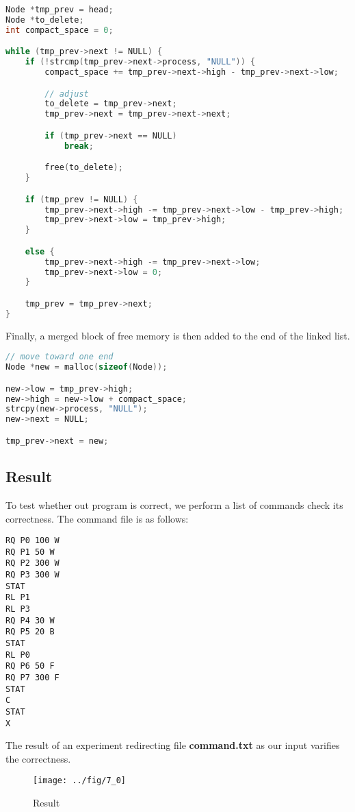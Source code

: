\documentclass{article}
\begin{document}
\begin{lstlisting}[language=c, caption={Traversing the Linked List}]
Node *tmp_prev = head;
Node *to_delete;
int compact_space = 0;

while (tmp_prev->next != NULL) {
    if (!strcmp(tmp_prev->next->process, "NULL")) {
        compact_space += tmp_prev->next->high - tmp_prev->next->low;

        // adjust
        to_delete = tmp_prev->next;
        tmp_prev->next = tmp_prev->next->next;

        if (tmp_prev->next == NULL)
            break;

        free(to_delete);
    }

    if (tmp_prev != NULL) {
        tmp_prev->next->high -= tmp_prev->next->low - tmp_prev->high;
        tmp_prev->next->low = tmp_prev->high;
    }

    else {
        tmp_prev->next->high -= tmp_prev->next->low;
        tmp_prev->next->low = 0;
    }

    tmp_prev = tmp_prev->next;
}
\end{lstlisting}

Finally, a merged block of free memory is then added to the end of the linked list.

\begin{lstlisting}[language=c, caption={Moving Holes Toward One End}]
// move toward one end
Node *new = malloc(sizeof(Node));

new->low = tmp_prev->high;
new->high = new->low + compact_space;
strcpy(new->process, "NULL");
new->next = NULL;

tmp_prev->next = new;
\end{lstlisting}

\subsection*{Result}
To test whether out program is correct, we perform a list of commands check its correctness. The command file is as follows:

\begin{lstlisting}[caption={command.txt}]
RQ P0 100 W
RQ P1 50 W
RQ P2 300 W
RQ P3 300 W	
STAT
RL P1
RL P3
RQ P4 30 W
RQ P5 20 B
STAT
RL P0
RQ P6 50 F
RQ P7 300 F
STAT
C
STAT
X
\end{lstlisting}

The result of an experiment redirecting file \textbf{command.txt} as our input varifies the correctness.

\begin{figure}[h]
    \centering
    
    \texttt{[image: ../fig/7\_0]}
    \caption{Result}
    \label{7_0}
\end{figure}
\end{document}
